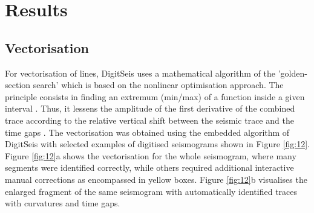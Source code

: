 \documentclass[sensors,article,accept,moreauthors,pdftex]{Definitions/mdpi}
\begin{document}
\section{Results}

\subsection{Vectorisation}

For {vectorisation of} lines, DigitSeis uses a mathematical algorithm of {the }'golden-section search' {which is }based on the nonlinear optimisation approach{. The principle consists in finding }an extremum (min/max) of a function inside a given interval \cite{Kiefer,Press}. Thus{, }it lessens the amplitude of the first derivative of the combined trace according to the relative vertical shift between the seismic trace and {the }time gaps \cite{BogiatzisIshii2016}. The vectorisation was obtained using the embedded algorithm of DigitSeis{ with selected }examples{ of digitised }seismograms{ }shown in Figure \ref{fig:12}.{ }Figure \ref{fig:12}a shows the vectorisation for the whole seismogram, {where }many segments were identified correctly, while others required {additional }interactive {manual }corrections{ as }encompassed in yellow boxes{. }\linebreak Figure \ref{fig:12}b visualises the enlarged fragment of the same seismogram with automatically identified traces with curvatures and time gaps. 
\end{document}
